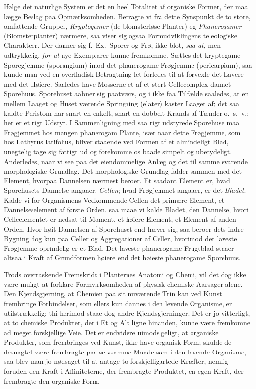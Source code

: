 \documentclass[12pt]{book}
\newcommand{\apage}[1]{\marginnote{\footnotesize\textit{[#1]}}}
\begin{document}
Ifølge det naturlige System er det en heel Totalitet af organiske Former,
der maa lægge Beslag paa Opmærksomheden. Betragte vi fra dette Synspunkt de
to store, omfattende Grupper, \emph{Kryptogamer} \apage{186} (de blomsterløse Planter) og
\emph{Phanerogamer} (Blomsterplanter) nærmere, saa viser sig ogsaa
Formudviklingens teleologiske Charakteer. Der danner sig f.\ Ex.\ Sporer og
Frø, ikke blot, \emph{saa at}, men udtrykkelig, \emph{for at} nye Exemplarer kunne
fremkomme. Sættes det kryptogame Sporegjemme (sporangium) imod det
phanerogame Frøgjemme (pericarpium), saa kunde man ved en
overfladisk Betragtning let forledes til at forvexle det Lavere med det
Høiere. Saaledes have Mosserne et af et stort Cellecomplex dannet
Sporehuus. Sporehuset aabner sig paatværs, og i ikke faa Tilfælde saaledes,
at en mellem Laaget og Huset værende Springring (elater) kaster
Laaget af; det saa kaldte Peristom har snart en enkelt, snart en dobbelt
Krands af Tænder o.\ s.\ v.; her er et rigt Udstyr. I Sammenligning med saa
rigt udstyrede Sporehuse maa Frøgjemmet hos mangen phanerogam Plante, især
naar dette Frøgjemme, som hos Lathyrus latifolius, bliver staaende
ved Formen af et almindeligt Blad, unegtelig tage sig fattigt ud og
forekomme os baade simpelt og ubetydeligt. Anderledes, naar vi see paa det
eiendommelige Anlæg og det til samme svarende morphologiske Grundlag. Det
morphologiske Grundlag falder sammen med det Element, hvorpaa Dannelsen
nærmest beroer. Et saadant Element er, hvad Sporehusets Dannelse angaaer,
\emph{Cellen}; hvad Frøgjemmet angaaer, er det \emph{Bladet}. Kalde vi for Organismens
Vedkommende Cellen det primære Element, et Dannelseselement af første Orden,
saa maae vi kalde Bladet, den Dannelse, hvori Celleelementet er nedsat til
Moment, et høiere \apage{187} Element, et Element af anden Orden. Hvor høit Dannelsen af
Sporehuset end hæver sig, saa beroer dets indre Bygning dog kun paa Celler
og Aggregationer af Celler, hvorimod det laveste Frøgjemme oprindelig er et
Blad. Det laveste phanerogame Frugtblad staaer altsaa i Kraft af
Grundformen høiere end det høieste phanerogame Sporehuus.

Trods overraskende Fremskridt i Planternes Anatomi og Chemi, vil det dog
ikke være muligt at forklare Formvirksomheden af physisk-chemiske Aarsager
alene. Den Kjendsgjerning, at Chemien paa sit nuværende Trin kan ved Kunst
frembringe Forbindelser, som ellers kun dannes i den levende Organisme, er
utilstrækkelig; thi herimod staae dog andre Kjendsgjerninger. Det er jo
vitterligt, at to chemiske Produkter, der i Et og Alt ligne hinanden, kunne
være fremkomne ad meget forskjellige Veie. Det er endvidere uimodsigeligt,
at organiske Produkter, som frembringes ved Kunst, ikke have organisk Form;
skulde de desuagtet være frembragte paa selvsamme Maade som i den levende
Organisme, saa blev man jo nødsaget til at antage to forskjelligartede
Kræfter, nemlig foruden den Kraft i Affiniteterne, der frembragte Produktet,
en egen Kraft, der frembragte den organiske Form.
\end{document}

